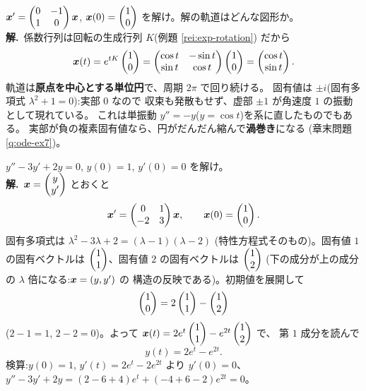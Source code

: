 \begin{rei}[例題・標準(振動:複素固有値と回転)]\label{rei:ode-rotation}
$\bm{x}' = \begin{pmatrix}0 & -1 \\ 1 & 0\end{pmatrix}\bm{x}$,
$\bm{x}(0) = \begin{pmatrix}1 \\ 0\end{pmatrix}$ を解け。解の軌道はどんな図形か。\\
\textbf{解.}\ 係数行列は回転の生成行列 $K$(例題 \ref{rei:exp-rotation})
だから
\[
\bm{x}(t) = e^{tK}\begin{pmatrix}1 \\ 0\end{pmatrix}
= \begin{pmatrix}\cos t & -\sin t \\ \sin t & \cos t\end{pmatrix}\begin{pmatrix}1 \\ 0\end{pmatrix}
= \begin{pmatrix}\cos t \\ \sin t\end{pmatrix}.
\]
軌道は\textbf{原点を中心とする単位円}で、周期 $2\pi$ で回り続ける。
固有値は $\pm i$(固有多項式 $\lambda^2 + 1 = 0$):実部 $0$ なので
収束も発散もせず、虚部 $\pm 1$ が角速度 $1$ の振動として現れている。
これは単振動 $y'' = -y$($y = \cos t$)を系に直したものでもある。
実部が負の複素固有値なら、円がだんだん縮んで\textbf{渦巻き}になる
(章末問題 \ref{q:ode-ex7})。
\end{rei}

\begin{rei}[例題・標準($2$ 階方程式を系に直して解く)]\label{rei:ode-2nd}
$y'' - 3y' + 2y = 0$, $y(0) = 1$, $y'(0) = 0$ を解け。\\
\textbf{解.}\ $\bm{x} = \begin{pmatrix}y \\ y'\end{pmatrix}$ とおくと
\[
\bm{x}' = \begin{pmatrix}0 & 1 \\ -2 & 3\end{pmatrix}\bm{x}, \qquad
\bm{x}(0) = \begin{pmatrix}1 \\ 0\end{pmatrix}.
\]
固有多項式は $\lambda^2 - 3\lambda + 2 = (\lambda - 1)(\lambda - 2)$
(特性方程式そのもの)。固有値 $1$ の固有ベクトルは
$\begin{pmatrix}1 \\ 1\end{pmatrix}$、固有値 $2$ の固有ベクトルは $\begin{pmatrix}1 \\ 2\end{pmatrix}$
(下の成分が上の成分の $\lambda$ 倍になる:$\bm{x} = (y, y')$ の
構造の反映である)。初期値を展開して
\[
\begin{pmatrix}1 \\ 0\end{pmatrix} = 2\begin{pmatrix}1 \\ 1\end{pmatrix} - \begin{pmatrix}1 \\ 2\end{pmatrix}
\]
($2 - 1 = 1$, $2 - 2 = 0$)。よって
$\bm{x}(t) = 2e^{t}\begin{pmatrix}1 \\ 1\end{pmatrix} - e^{2t}\begin{pmatrix}1 \\ 2\end{pmatrix}$ で、
第 $1$ 成分を読んで
\[
y(t) = 2e^{t} - e^{2t}.
\]
検算:$y(0) = 1$, $y'(t) = 2e^t - 2e^{2t}$ より $y'(0) = 0$、
$y'' - 3y' + 2y = (2 - 6 + 4)e^t + (-4 + 6 - 2)e^{2t} = 0$。
\end{rei}

